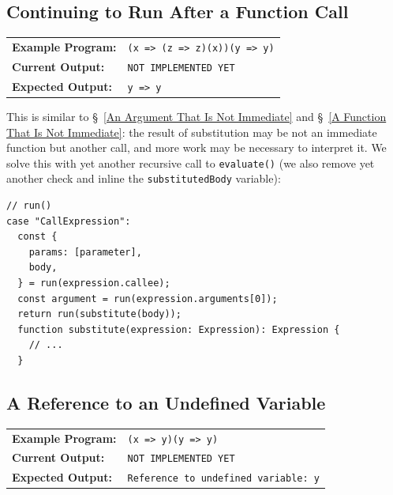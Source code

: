 \documentclass[12pt, oneside]{book}
\begin{document}
\subsection{Continuing to Run After a Function Call}
\label{Continuing to Run After a Function Call}

\begin{center}
\begin{tabular}{ll}
\textbf{Example Program:} & \texttt{(x => (z => z)(x))(y => y)} \\
\textbf{Current Output:} & \texttt{NOT IMPLEMENTED YET} \\
\textbf{Expected Output:} & \texttt{y => y} \\
\end{tabular}
\end{center}

This is similar to §~\ref{An Argument That Is Not Immediate} and §~\ref{A Function That Is Not Immediate}: the result of substitution may be not an immediate function but another call, and more work may be necessary to interpret it. We solve this with yet another recursive call to \texttt{evaluate()} (we also remove yet another check and inline the \texttt{substitutedBody} variable):

\begin{verbatim}
// run()
case "CallExpression":
  const {
    params: [parameter],
    body,
  } = run(expression.callee);
  const argument = run(expression.arguments[0]);
  return run(substitute(body));
  function substitute(expression: Expression): Expression {
    // ...
  }
\end{verbatim}

\subsection{A Reference to an Undefined Variable}

\begin{center}
\begin{tabular}{ll}
\textbf{Example Program:} & \texttt{(x => y)(y => y)} \\
\textbf{Current Output:} & \texttt{NOT IMPLEMENTED YET} \\
\textbf{Expected Output:} & \texttt{Reference to undefined variable: y} \\
\end{tabular}
\end{center}
\end{document}
